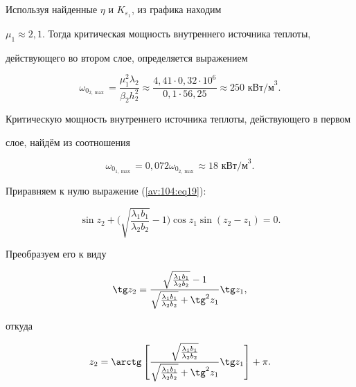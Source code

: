 Используя найденные $\eta $ и $K_{\varepsilon _1 } $, из графика находим

$\mu _1 \approx2,1$. Тогда критическая мощность внутреннего источника теплоты,

действующего во втором слое, определяется выражением

\[

\omega _{0_{2,\max} } = \frac{\mu _1^2 \lambda _2 }{\beta _2 h_2^2}\approx \frac{4,41\cdot 0,32\cdot 10^6}{0,1\cdot 56,25}\approx 250\text{~кВт/м}^3.

\]

Критическую мощность внутреннего источника теплоты, действующего в первом

слое, найдём из соотношения

\[

\omega _{0_{1,\max } } =0,072 \omega _{0_{2,\max } } \approx 18\text{~кВт/м}^3.

\]





Приравняем к нулю выражение (\ref{av:104:eq19}):

\begin{equation}

\label{av:104:eq26}

\sin z_2 +\biggl(\sqrt {\frac{\lambda _1 b_1 }{\lambda _2 b_2 }} -1\biggr)\cos z_1 \sin (z_2 -z_1 )=0.

\end{equation}

Преобразуем его к виду

\begin{equation}

\label{av:104:eq27}

\tg z_2 =\frac{\sqrt {\frac{\lambda _1 b_1 }{\lambda _2 b_2 }} -1}{\sqrt

{\frac{\lambda _1 b_1 }{\lambda _2 b_2 }} +\tg^2z_1 }\tg z_1 ,

\end{equation}

откуда

\begin{equation}

\label{av:104:eq28}

z_2 =\arctg\left[ \frac{\sqrt {\frac{\lambda _1 b_1 }{\lambda _2 b_2

}} }{\sqrt {\frac{\lambda _1 b_1 }{\lambda _2 b_2 }} +\tg^2z_1 } \tg z_1 \right]+\pi

.

\end{equation}

